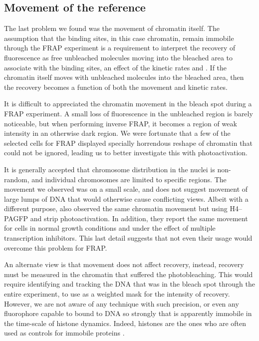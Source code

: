   \subsection{Movement of the reference}

    The last problem we found was the movement of chromatin itself.
    The assumption that the binding sites, in this case chromatin, remain
    immobile through the FRAP experiment is a requirement to interpret
    the recovery of fluorescence as free unbleached molecules moving into the
    bleached area to associate with the binding sites, an effect of the
    kinetic rates \Kon{} and \Koff{}. If the chromatin itself moves with
    unbleached molecules into the bleached area, then the recovery becomes
    a function of both the movement and kinetic rates.

    It is difficult to appreciated the chromatin movement in the bleach
    spot during a FRAP experiment. A small loss of fluorescence
    in the unbleached region is barely noticeable, but when performing
    inverse FRAP, it becomes a region of weak intensity in an otherwise
    dark region. We were fortunate that a few of the selected cells for
    FRAP displayed specially horrendous reshape of chromatin that could
    not be ignored, leading us to better investigate this with photoactivation.

    It is generally accepted that chromosome distribution in the nuclei
    is non-random, and individual chromosomes are limited to specific
    regions. The movement we observed was on a small scale, and does not
    suggest movement of large lumps of DNA that would otherwise cause
    conflicting views. Albeit with a different purpose,
    \cite{H4PAGFP-chromatin-movement} also observed the same chromatin movement
    but using H4--PAGFP and strip photoactivation. In addition, they report
    the same movement for cells in normal growth conditions and under the
    effect of multiple transcription inhibitors. This last detail suggests that
    not even their usage would overcome this problem for FRAP.

    An alternate view is that movement does not affect recovery, instead,
    recovery must be measured in the chromatin that suffered the photobleaching.
    This would require identifying and tracking the DNA that was in the bleach
    spot through the entire experiment, to use as a weighted mask for the
    intensity of recovery. However, we are not aware of any technique with
    such precision, or even any fluorophore capable to bound to DNA so strongly
    that is apparently immobile in the time-scale of histone dynamics.
    Indeed, histones are the ones who are often used as controls for immobile proteins
    \citep{histone-control-immobile1, histone-control-immobile2}.

